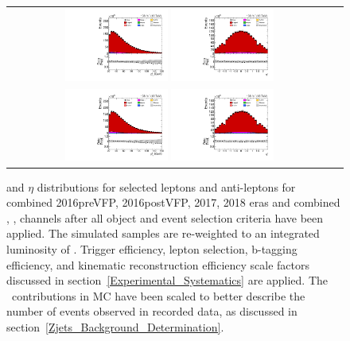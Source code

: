 \begin{figure}[htb]
    \begin{center}
        \begin{tabular}{cc}
            \includegraphics[width=0.325\textwidth]{fig_fullRun2UL/controlplots/combined/HypLeptonpT.pdf}
            \includegraphics[width=0.325\textwidth]{fig_fullRun2UL/controlplots/combined/HypLeptonEta.pdf} \\
            \includegraphics[width=0.325\textwidth]{fig_fullRun2UL/controlplots/combined/HypAntiLeptonpT.pdf}
            \includegraphics[width=0.325\textwidth]{fig_fullRun2UL/controlplots/combined/HypAntiLeptonEta.pdf}
        \end{tabular}
        \caption{\footnotesize \pT and $\eta$ distributions for selected leptons and anti-leptons for combined 2016preVFP, 2016postVFP, 2017, 2018 eras and combined \ee, \emu, \mumu channels after all object and event selection criteria have been applied.
        The simulated samples are re-weighted to an integrated luminosity of \lumivalueRuniiUL.
        Trigger efficiency, lepton selection, b-tagging efficiency, and kinematic reconstruction efficiency scale factors discussed in section~\ref{Experimental_Systematics} are applied.
        The \zjets\ contributions in MC have been scaled to better describe the number of events observed in recorded data, as discussed in section~\ref{Zjets_Background_Determination}.
        }
    \end{center}
\end{figure}

